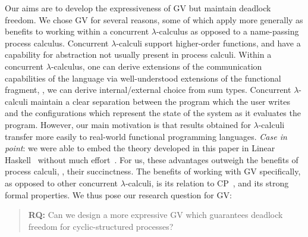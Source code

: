 \documentclass[main.tex]{subfiles}
\begin{document}
Our aims are to develop the expressiveness of GV but maintain deadlock freedom. We chose GV for several reasons, some of which apply more generally as benefits to working within a concurrent $\lambda$-calculus as opposed to a name-passing process calculus. Concurrent $\lambda$-calculi support higher-order functions, and have a capability for abstraction not usually present in process calculi. Within a concurrent $\lambda$-calculus, one can derive extensions of the communication capabilities of the language via well-understood extensions of the functional fragment, \eg, we can derive internal/external choice from sum types. Concurrent $\lambda$-calculi maintain a clear separation between the program which the user writes and the configurations which represent the state of the system as it evaluates the program. However, our main motivation is that results obtained for $\lambda$-calculi transfer more easily to real-world functional programming languages. \emph{Case in point}: we were able to embed the theory developed in this paper in Linear Haskell~\cite{bernardyboespflug18} without much effort~\cite{KD21b}. For us, these advantages outweigh the benefits of process calculi, \eg, their succinctness.
The benefits of working with GV specifically, as opposed to other concurrent $\lambda$-calculi, is its relation to CP~\cite{wadler14}, and its strong formal properties. We thus pose our research question for GV:
\begin{quotation}
  \textbf{RQ:}
  Can we design a more expressive GV which guarantees deadlock freedom for cyclic-structured processes?
\end{quotation}
\end{document}
